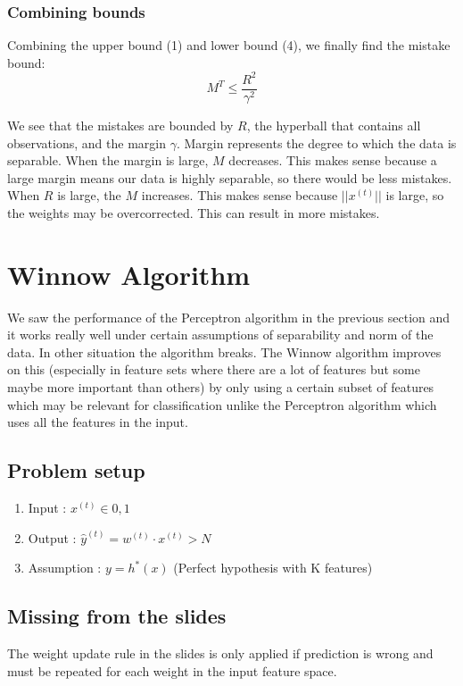 \documentclass[11pt]{article}
\begin{document}
\subsubsection{Combining bounds}
Combining the upper bound (1) and lower bound (4), we finally find the mistake bound:
\begin{equation}
    \boxed{M^T \leq \frac{R^2}{\gamma^2}}
\end{equation}

We see that the mistakes are bounded by $R$, the hyperball that contains all observations, and the margin $\gamma$. Margin represents the degree to which the data is separable. When the margin is large, $M$ decreases. This makes sense because a large margin means our data is highly separable, so there would be less mistakes. When $R$ is large, the $M$ increases. This makes sense because $||x^{(t)}||$ is large, so the weights may be overcorrected. This can result in more mistakes. 

\section{Winnow Algorithm}

We saw the performance of the Perceptron algorithm in the previous section and it works really well under certain assumptions of separability and norm of the data. In other situation the algorithm breaks. The Winnow algorithm improves on this (especially in feature sets where there are a lot of features but some maybe more important than others) by only using a certain subset of features which may be relevant for classification unlike the Perceptron algorithm which uses all the features in the input.

\subsection{Problem setup}

\begin{enumerate}
    \item Input :  $x^{(t)} \in {0,1} $
    \item Output : $\hat{y}^{(t)} = w^{(t)}\cdot x^{(t)} > N$
    \item Assumption : $y=h^*(x)$ (Perfect hypothesis with K features)
\end{enumerate}

\subsection{Missing from the slides}

The weight update rule in the slides is only applied if prediction is wrong and must be repeated for each weight in the input feature space.
\end{document}
